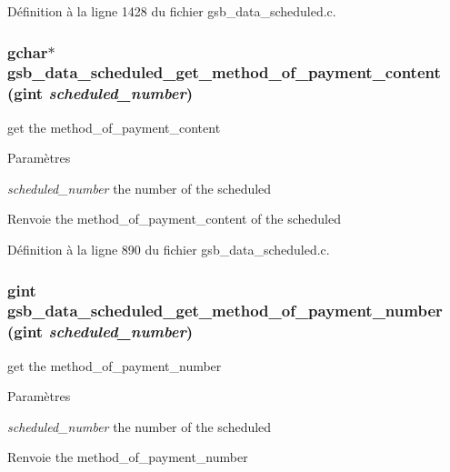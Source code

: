Définition à la ligne 1428 du fichier gsb\_\-data\_\-scheduled.c.

\subsubsection[{gsb\_\-data\_\-scheduled\_\-get\_\-method\_\-of\_\-payment\_\-content}]{\setlength{\rightskip}{0pt plus 5cm}gchar$\ast$ gsb\_\-data\_\-scheduled\_\-get\_\-method\_\-of\_\-payment\_\-content (gint {\em scheduled\_\-number})}\label{gsb__data__scheduled_8h_a906e28f3b1d76861e4cd297bb59d66d5}
get the method\_\-of\_\-payment\_\-content


\begin{DoxyParams}{Paramètres}
\item[{\em scheduled\_\-number}]the number of the scheduled\end{DoxyParams}
\begin{DoxyReturn}{Renvoie}
the method\_\-of\_\-payment\_\-content of the scheduled 
\end{DoxyReturn}


Définition à la ligne 890 du fichier gsb\_\-data\_\-scheduled.c.

\subsubsection[{gsb\_\-data\_\-scheduled\_\-get\_\-method\_\-of\_\-payment\_\-number}]{\setlength{\rightskip}{0pt plus 5cm}gint gsb\_\-data\_\-scheduled\_\-get\_\-method\_\-of\_\-payment\_\-number (gint {\em scheduled\_\-number})}\label{gsb__data__scheduled_8h_acd7da6799398885afd2e3a58eaa7fe1a}
get the method\_\-of\_\-payment\_\-number


\begin{DoxyParams}{Paramètres}
\item[{\em scheduled\_\-number}]the number of the scheduled\end{DoxyParams}
\begin{DoxyReturn}{Renvoie}
the method\_\-of\_\-payment\_\-number 
\end{DoxyReturn}


